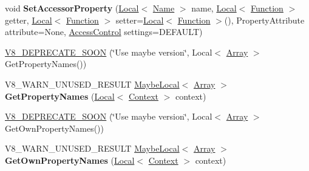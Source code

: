 \begin{DoxyCompactItemize}
\item 
\hypertarget{classv8_1_1Object_a284911d760fc853d81adf98c242bc453}{}void {\bfseries Set\+Accessor\+Property} (\hyperlink{classv8_1_1Local}{Local}$<$ \hyperlink{classv8_1_1Name}{Name} $>$ name, \hyperlink{classv8_1_1Local}{Local}$<$ \hyperlink{classv8_1_1Function}{Function} $>$ getter, \hyperlink{classv8_1_1Local}{Local}$<$ \hyperlink{classv8_1_1Function}{Function} $>$ setter=\hyperlink{classv8_1_1Local}{Local}$<$ \hyperlink{classv8_1_1Function}{Function} $>$(), Property\+Attribute attribute=None, \hyperlink{namespacev8_a31d8355cb043d7d2dda3f4a52760b64e}{Access\+Control} settings=D\+E\+F\+A\+U\+L\+T)\label{classv8_1_1Object_a284911d760fc853d81adf98c242bc453}

\item 
\hyperlink{classv8_1_1Object_a3f735ad2eab826ddc5eba467ce624acb}{V8\+\_\+\+D\+E\+P\+R\+E\+C\+A\+T\+E\+\_\+\+S\+O\+O\+N} (\char`\"{}Use maybe version\char`\"{}, Local$<$ \hyperlink{classv8_1_1Array}{Array} $>$ Get\+Property\+Names())
\item 
\hypertarget{classv8_1_1Object_a771be1943535959085da5c384f8e6405}{}V8\+\_\+\+W\+A\+R\+N\+\_\+\+U\+N\+U\+S\+E\+D\+\_\+\+R\+E\+S\+U\+L\+T \hyperlink{classv8_1_1MaybeLocal}{Maybe\+Local}$<$ \hyperlink{classv8_1_1Array}{Array} $>$ {\bfseries Get\+Property\+Names} (\hyperlink{classv8_1_1Local}{Local}$<$ \hyperlink{classv8_1_1Context}{Context} $>$ context)\label{classv8_1_1Object_a771be1943535959085da5c384f8e6405}

\item 
\hyperlink{classv8_1_1Object_aa72e9d0d22d1d4a4c4b63827a5469d40}{V8\+\_\+\+D\+E\+P\+R\+E\+C\+A\+T\+E\+\_\+\+S\+O\+O\+N} (\char`\"{}Use maybe version\char`\"{}, Local$<$ \hyperlink{classv8_1_1Array}{Array} $>$ Get\+Own\+Property\+Names())
\item 
\hypertarget{classv8_1_1Object_ab4f1fc692a02c11d749a7d5120e67026}{}V8\+\_\+\+W\+A\+R\+N\+\_\+\+U\+N\+U\+S\+E\+D\+\_\+\+R\+E\+S\+U\+L\+T \hyperlink{classv8_1_1MaybeLocal}{Maybe\+Local}$<$ \hyperlink{classv8_1_1Array}{Array} $>$ {\bfseries Get\+Own\+Property\+Names} (\hyperlink{classv8_1_1Local}{Local}$<$ \hyperlink{classv8_1_1Context}{Context} $>$ context)\label{classv8_1_1Object_ab4f1fc692a02c11d749a7d5120e67026}


\end{DoxyCompactItemize}
